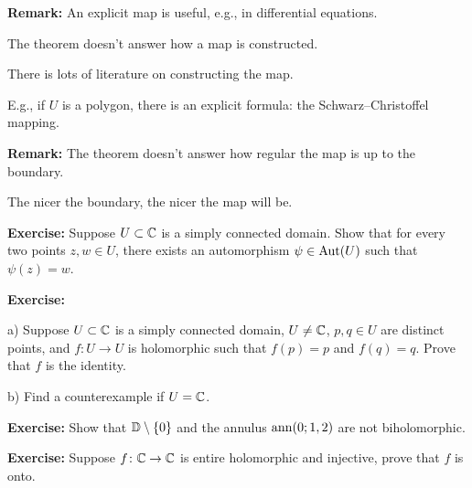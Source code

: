 \documentclass[10pt,aspectratio=169]{beamer}
\begin{document}
\begin{frame}
\textbf{Remark:}
An explicit map is useful, e.g., in differential equations.

\pause
The theorem doesn't answer how a map is constructed.

\pause
There is lots of literature on constructing the map.

\pause
E.g., if $U$ is a polygon, there is an explicit formula:
the Schwarz--Christoffel mapping.

\medskip
\pause

\textbf{Remark:}
The theorem doesn't answer how regular the map is up to the boundary.

\pause
The nicer the boundary, the nicer the map will be.

\end{frame}

\begin{frame}
\textbf{Exercise:}
Suppose $U \subset {\mathbb{C}}$ is a simply connected domain.
Show that for every two points $z,w \in U$, there exists an automorphism
$\psi \in \operatorname{Aut}(U)$ such that $\psi(z) = w$.

\pause
\medskip

\textbf{Exercise:}

a)
Suppose $U \subset {\mathbb{C}}$ is a simply connected domain, $U \not= {\mathbb{C}}$,
$p,q \in U$ are distinct points, and
$f \colon U \to U$ is holomorphic such that $f(p) = p$ and $f(q)=q$.
Prove that $f$ is the identity.

\pause
b)
Find a counterexample if $U={\mathbb{C}}$.

\pause
\medskip

\textbf{Exercise:}
Show that ${\mathbb{D}} \setminus \{ 0 \}$
and the annulus $\operatorname{ann}(0;1,2)$ are not biholomorphic.

\pause
\medskip

\textbf{Exercise:}
Suppose $f \colon {\mathbb{C}} \to {\mathbb{C}}$ is entire holomorphic and
injective, prove that $f$ is onto.


\end{frame}
\end{document}

